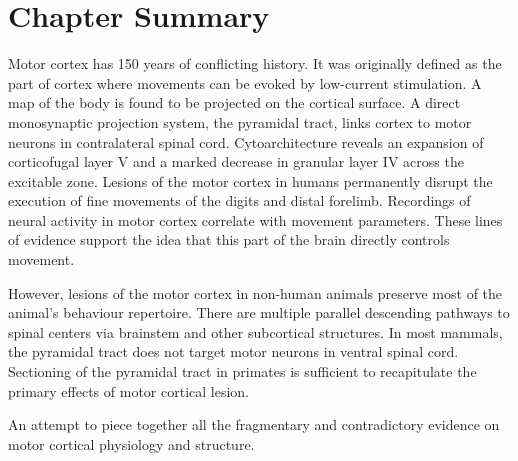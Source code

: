 				
\section{Chapter Summary}

Motor cortex has 150 years of conflicting history. It was originally defined as the part of cortex where movements can be evoked by low-current stimulation. A map of the body is found to be projected on the cortical surface. A direct monosynaptic projection system, the pyramidal tract, links cortex to motor neurons in contralateral spinal cord. Cytoarchitecture reveals an expansion of corticofugal layer V and a marked decrease in granular layer IV across the excitable zone. Lesions of the motor cortex in humans permanently disrupt the execution of fine movements of the digits and distal forelimb. Recordings of neural activity in motor cortex correlate with movement parameters. These lines of evidence support the idea that this part of the brain directly controls movement.

However, lesions of the motor cortex in non-human animals preserve most of the animal's behaviour repertoire. There are multiple parallel descending pathways to spinal centers via brainstem and other subcortical structures. In most mammals, the pyramidal tract does not target motor neurons in ventral spinal cord. Sectioning of the pyramidal tract in primates is sufficient to recapitulate the primary effects of motor cortical lesion.

An attempt to piece together all the fragmentary and contradictory evidence on motor cortical physiology and structure.

\pagebreak


